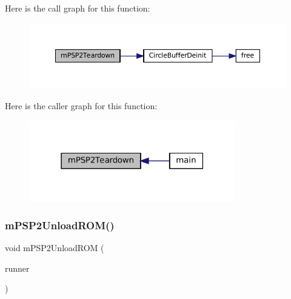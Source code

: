 Here is the call graph for this function\+:
\nopagebreak
\begin{figure}[H]
\begin{center}
\leavevmode
\includegraphics[width=350pt]{psp2-context_8h_aaae5f4b3a42c091f809836cec74d1cd7_cgraph}
\end{center}
\end{figure}
Here is the caller graph for this function\+:
\nopagebreak
\begin{figure}[H]
\begin{center}
\leavevmode
\includegraphics[width=255pt]{psp2-context_8h_aaae5f4b3a42c091f809836cec74d1cd7_icgraph}
\end{center}
\end{figure}
\mbox{\label{psp2-context_8h_a94ad5d2964da6bad167ee85e5f021421}} 
\subsubsection{\texorpdfstring{m\+P\+S\+P2\+Unload\+R\+O\+M()}{mPSP2UnloadROM()}}
{\footnotesize\ttfamily void m\+P\+S\+P2\+Unload\+R\+OM (\begin{DoxyParamCaption}\item[{struct \mbox{\hyperlink{structm_g_u_i_runner}{m\+G\+U\+I\+Runner}} $\ast$}]{runner }\end{DoxyParamCaption})}

